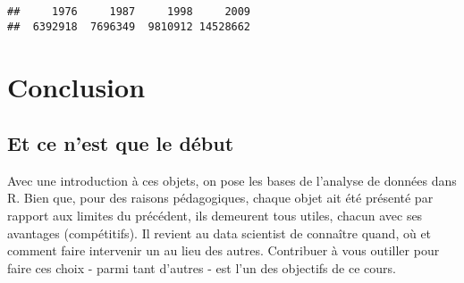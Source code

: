 \documentclass[]{book}
\begin{document}
\begin{verbatim}
##     1976     1987     1998     2009 
##  6392918  7696349  9810912 14528662
\end{verbatim}

\normalsize

\section{Conclusion}\label{conclusion}

\subsection{Et ce n'est que le début}\label{et-ce-nest-que-le-debut}

Avec une introduction à ces objets, on pose les bases de l'analyse de
données dans R. Bien que, pour des raisons pédagogiques, chaque objet
ait été présenté par rapport aux limites du précédent, ils demeurent
tous utiles, chacun avec ses avantages (compétitifs). Il revient au data
scientist de connaître quand, où et comment faire intervenir un au lieu
des autres. Contribuer à vous outiller pour faire ces choix - parmi tant
d'autres - est l'un des objectifs de ce cours.


\end{document}

